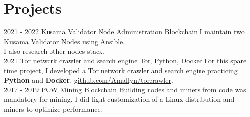 \documentclass[]{cv-class}
\begin{document}
\section{Projects}
\begin{entrylist}
  \entry
    {2021 - 2022}
    {Kusama Validator Node Administration}
    {Blockchain}
    {I maintain two Kusama Validator Nodes using Ansible.\\
    I also research other nodes stack.\\}
  \entry
    {2021}
    {Tor network crawler and search engine}
    {Tor, Python, Docker}
    {For this spare time project, I developed a Tor network crawler and search engine practicing \textbf{Python} and \textbf{Docker}. \underline{\href{https://github.com/Amallyn/torcrawler}{github.com/Amallyn/torcrawler}}.\\}
  \entry
    {2017 - 2019}
    {POW Mining}
    {Blockchain}
    {Building nodes and miners from code was mandatory for mining. I did light customization of a Linux distribution and miners to optimize performance.}
\end{entrylist}

\end{document}
